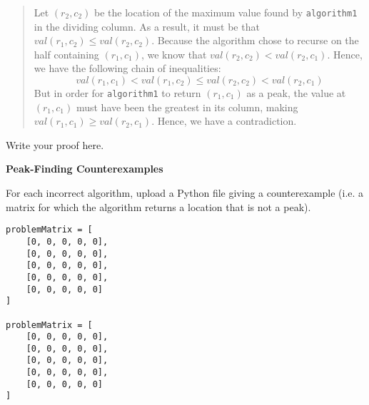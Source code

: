 \documentclass[12pt,twoside]{article}
\begin{document}
\begin{problems}
\begin{quote}
Let $(r_2, c_2)$ be
the location of the maximum value found by \texttt{algorithm1}
in the dividing column.
As a result, it must be that $val(r_1, c_2) \le val(r_2, c_2)$.
Because the algorithm chose to recurse
on the half containing $(r_1, c_1)$,
we know that $val(r_2, c_2) < val(r_2, c_1)$.
Hence, we have the following chain of inequalities:
$$val(r_1, c_1) < val(r_1, c_2) \le val(r_2, c_2) < val(r_2, c_1)$$
But in order for \texttt{algorithm1} to return $(r_1, c_1)$ as a peak,
the value at $(r_1, c_1)$ must have been the greatest in its column,
making $val(r_1, c_1) \ge val(r_2, c_1)$.
Hence, we have a contradiction.
\end{quote}

\ifsolution \solution{}
Write your proof here.
\fi

\problem {} \textbf{Peak-Finding Counterexamples}

For each incorrect algorithm,
upload a Python file giving a counterexample
(i.e. a matrix for which the algorithm returns a location
that is not a peak).

\ifsolution \solution{}
\begin{verbatim}
problemMatrix = [
    [0, 0, 0, 0, 0],
    [0, 0, 0, 0, 0],
    [0, 0, 0, 0, 0],
    [0, 0, 0, 0, 0],
    [0, 0, 0, 0, 0]
]

problemMatrix = [
    [0, 0, 0, 0, 0],
    [0, 0, 0, 0, 0],
    [0, 0, 0, 0, 0],
    [0, 0, 0, 0, 0],
    [0, 0, 0, 0, 0]
]
\end{verbatim}
\fi

\end{problems}
\end{document}
